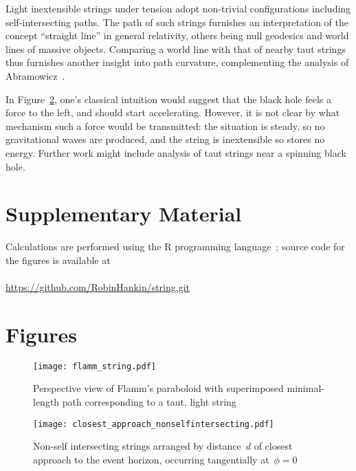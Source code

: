 \documentclass[prb,preprint]{revtex4-1}
\begin{document}
Light inextensible strings under tension adopt non-trivial
configurations including self-intersecting paths.  The path of such
strings furnishes an interpretation of the concept ``straight line''
in general relativity, others being null geodesics and world lines of
massive objects.  Comparing a world line with that of nearby taut
strings thus furnishes another insight into path curvature,
complementing the analysis of Abramowicz~\cite{abramowicz1992}.

In Figure~\ref{closest_approach_non_self_intersecting}, one's
classical intuition would suggest that the black hole feels a force to
the left, and should start accelerating.  However, it is not clear by
what mechanism such a force would be transmitted: the situation is
steady, so no gravitational waves are produced, and the string is
inextensible so stores no energy.  Further work might include analysis
of taut strings near a spinning black hole.




\section*{Supplementary Material}

Calculations are performed using the R programming language~\citep{rcore2018};
source code for the figures is available at
\\
\\
\url{https://github.com/RobinHankin/string.git}


\section*{Figures}

\begin{figure}[h!] %
\centering
\texttt{[image: flamm\_string.pdf]}
\caption{Perspective view of Flamm's paraboloid with superimposed minimal-length
  path corresponding to a taut, light string}
\label{flamm}
\end{figure}

\begin{figure}[p] %
\centering
\texttt{[image: closest\_approach\_nonselfintersecting.pdf]}
\caption{Non-self intersecting strings arranged by distance~$d$ of
  closest approach to the event horizon, occurring tangentially
  at~$\phi=0$}
\label{closest_approach_non_self_intersecting}
\end{figure}
\end{document}
